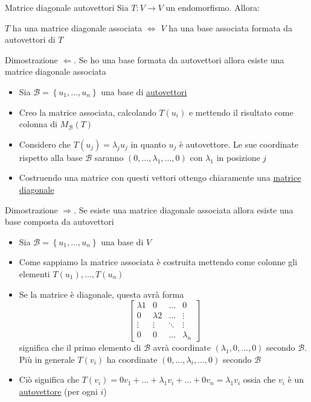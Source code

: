 \begin{teorema}{Matrice diagonale autovettori}
	Sia $ T : V \to V $ un endomorfismo. Allora:
	\begin{center}
		$ T $ ha una matrice diagonale associata $ \Leftrightarrow $ $ V $ ha una base associata formata da autovettori di $ T $
	\end{center}
\end{teorema}
\label{teo:diagonalizzabilità}
Dimostrazione $ \Leftarrow $. Se ho una base formata da autovettori allora esiste una matrice diagonale associata
\begin{itemize}
	\item Sia $ \mathcal{B}= \left\{ u_1,\ldots,u_n \right\}  $ una base di \underline{autovettori}
	\item Creo la matrice associata, calcolando $ T\left( u_i \right)  $ e mettendo il risultato come colonna di $ M_{ \mathcal{B}} \left( T \right)  $
	\item Considero che $ T\left( u_j \right) = \lambda_j u_j $ in quanto $ u_j $ è autovettore. Le sue coordinate rispetto alla base $ \mathcal{B} $ saranno $ \left( 0,\ldots, \lambda_1, \ldots, 0 \right)  $ con $ \lambda_1 $ in posizione $ j $
	\item Costruendo una matrice con questi vettori ottengo chiaramente una \underline{matrice diagonale}
\end{itemize}
Dimostrazione $ \Rightarrow $. Se esiste una matrice diagonale associata allora esiste una base composta da autovettori
\begin{itemize}
	\item Sia $ \mathcal{B} = \left\{ u_1,\ldots,u_n \right\}  $ una base di $ V $
	\item Come sappiamo la matrice associata è costruita mettendo come colonne gli elementi $ T\left( u_1 \right) ,\ldots, T\left( u_n \right)  $
	\item Se la matrice è diagonale, questa avrà forma
	      \[
		      \begin{bmatrix}
			      \lambda 1 & 0          & \ldots & 0          \\
			      0         & \lambda  2 & \ldots & \vdots     \\
			      \vdots    & \vdots     & \ddots & \vdots     \\
			      0         & 0          & \ldots & \lambda _n
		      \end{bmatrix}
	      \]
	      significa che il primo elemento di $ \mathcal{B} $ avrà coordinate $ \left( \lambda _1,0,\ldots,0 \right)  $ secondo $ \mathcal{B} $. Più in generale $ T\left( v_i \right)  $ ha coordinate $ \left( 0,\ldots, \lambda _i, \ldots,0 \right)  $ secondo $ \mathcal{B} $
	\item Ciò significa che $ T\left( v_i \right) = 0 v_1 + \ldots + \lambda_1 v_i + \ldots+ 0 v_n =\lambda _1 v_i$ ossia che $ v_i $ è un \underline{autovettore} (per ogni $ i $)
\end{itemize}

